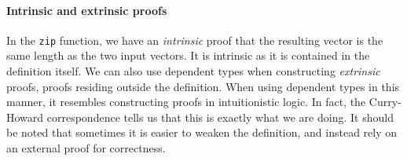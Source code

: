 \paragraph{Intrinsic and extrinsic proofs} In the \texttt{zip} function, we have an \emph{intrinsic} proof that the resulting vector is the same length as the two input vectors. It is intrinsic as it is contained in the definition itself. We can also use dependent types when constructing \emph{extrinsic} proofs, proofs residing outside the definition. When using dependent types in this manner, it resembles constructing proofs in intuitionistic logic. In fact, the Curry-Howard correspondence tells us that this is exactly what we are doing. It should be noted that sometimes it is easier to weaken the definition, and instead rely on an external proof for correctness.
